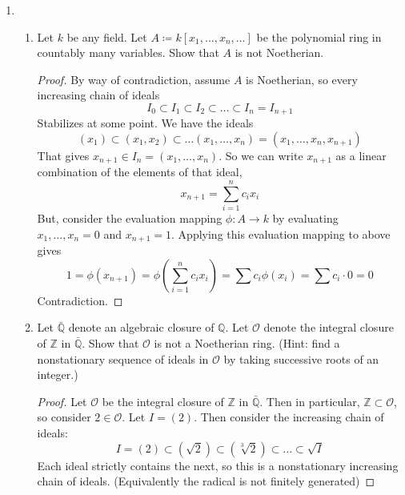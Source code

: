 \documentclass[hidelinks,12pt]{article}
\newcommand{\Z}{\mathbb{Z}}
\newcommand{\Q}{\mathbb{Q}}
\renewcommand{\O}{\mathcal{O}}
\begin{document}
\begin{enumerate}
\begin{enumerate}[label=(\alph*).]
\begin{proof}
                \end{proof} 
            \item 
        \end{enumerate}
    \item \begin{enumerate}[label=(\alph*).]
            \item Let \(k\) be any field. Let \(A\coloneqq k[x_{1},\dots,x_{n},\dots]\) be the polynomial ring in countably many variables. Show that \(A\) is not Noetherian.
                \begin{proof}
                    By way of contradiction, assume \(A\) is Noetherian, so every increasing chain of ideals \[
                        I_{0}\subset I_{1}\subset I_{2}\subset\dots\subset I_{n}=I_{n+1}
                    \]
                    Stabilizes at some point. We have the ideals
                    \[
                        (x_{1})\subset(x_{1},x_{2})\subset\dots(x_{1},\dots,x_{n})=(x_{1},\dots,x_{n},x_{n+1})
                    \]
                    That gives \(x_{n+1}\in I_{n}=(x_{1},\dots,x_{n})\). So we can write \(x_{n+1}\) as a linear combination of the elements of that ideal,
                    \[
                        x_{n+1}=\sum_{i=1}^{n} c_{i}x_{i}
                    \]
                    But, consider the evaluation mapping \(\phi:A\to k\) by evaluating \(x_{1},\dots,x_{n}=0\) and \(x_{n+1}=1\). Applying this evaluation mapping to above gives \[
                        1=\phi(x_{n+1})=\phi(\sum_{i=1}^{n} c_{i}x_{i})=\sum c_{i}\phi(x_{i})=\sum c_{i}\cdot0=0
                    \]
                    Contradiction. 
                \end{proof}
            \item Let \(\bar{\Q}\) denote an algebraic closure of \(\Q\). Let \(\O\) denote the integral closure of \(\Z\) in \(\bar{\Q}\). Show that \(\O\) is not a Noetherian ring. (Hint: find a nonstationary sequence of ideals in \(\O\) by taking successive roots of an integer.)
                \begin{proof}
                    Let \(\O\) be the integral closure of \(\Z\) in \(\bar{\Q}\). Then in particular, \(\Z\subset\O\), so consider \(2\in\O\). Let \(I=(2)\). Then consider the increasing chain of ideals:
                    \[
                        I=(2)\subset(\sqrt{2})\subset(\sqrt[3]{2})\subset\dots\subset\sqrt{I}
                    \]
                    Each ideal strictly contains the next, so this is a nonstationary increasing chain of ideals. (Equivalently the radical is not finitely generated)

\end{proof}
\end{enumerate}
\end{enumerate}
\end{document}
